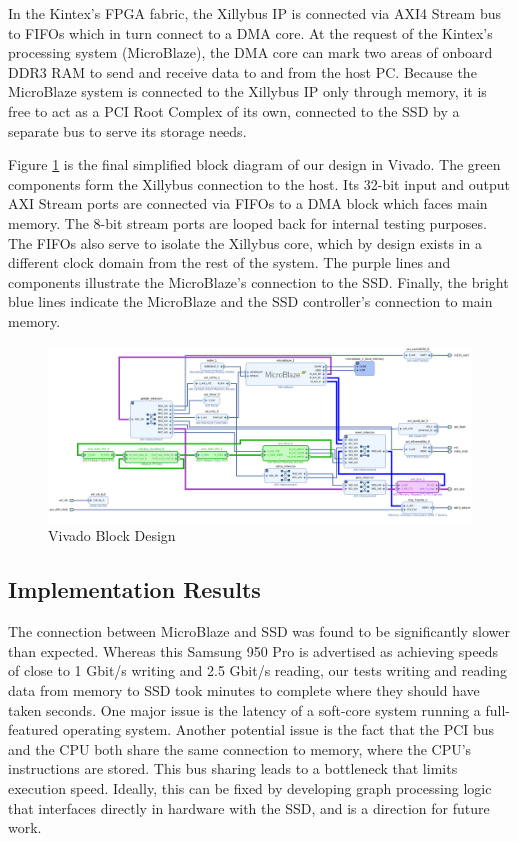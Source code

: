 In the Kintex's FPGA fabric, the Xillybus IP is connected via AXI4 Stream bus to FIFOs which in turn connect to a DMA core.  At the request of the Kintex's processing system (MicroBlaze), the DMA core can mark two areas of onboard DDR3 RAM to send and receive data to and from the host PC.  Because the MicroBlaze system is connected to the Xillybus IP only through memory, it is free to act as a PCI Root Complex of its own, connected to the SSD by a separate bus to serve its storage needs.

Figure \ref{fig:Vivado} is the final simplified block diagram of our design in Vivado.  The green components form the Xillybus connection to the host.  Its 32-bit input and output AXI Stream ports are connected via FIFOs to a DMA block which faces main memory.  The 8-bit stream ports are looped back for internal testing purposes.  The FIFOs also serve to isolate the Xillybus core, which by design exists in a different clock domain from the rest of the system.  The purple lines and components illustrate the MicroBlaze's connection to the SSD.  Finally, the bright blue lines indicate the MicroBlaze and the SSD controller's connection to main memory.

\begin{figure}[h]
  \includegraphics[width=\textwidth,keepaspectratio]{pic/block.png}
  \caption{Vivado Block Design}
  \label{fig:Vivado}
\end{figure}

\subsection{Implementation Results}

The connection between MicroBlaze and SSD was found to be significantly slower than expected.  Whereas this Samsung 950 Pro is advertised as achieving speeds of close to 1 Gbit/s writing and 2.5 Gbit/s reading, our tests writing and reading data from memory to SSD took minutes to complete where they should have taken seconds.  One major issue is the latency of a soft-core system running a full-featured operating system.  Another potential issue is the fact that the PCI bus and the CPU both share the same connection to memory, where the CPU's instructions are stored.  This bus sharing leads to a bottleneck that limits execution speed.  Ideally, this can be fixed by developing graph processing logic that interfaces directly in hardware with the SSD, and is a direction for future work.

